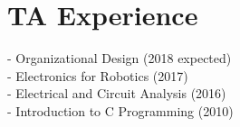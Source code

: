 \documentclass[]{deedy-resume-openfont}
\begin{document}
\begin{minipage}[t]{0.35\textwidth}
\section{TA Experience}
- Organizational Design (2018 expected) \\
- Electronics for Robotics (2017) \\
- Electrical and Circuit Analysis (2016) \\
- Introduction to C Programming (2010) \\
\sectionsep



\iffalse %
\section{Achievements}
- BCIT Graduating Achievement Award for Leadership and Teamwork (2016) \\
- BCIT Award for Distinction (2016) \\
- PepsiCo TPM and Lean Six Sigma (2013) \\
- APEGBC Engineer-in-Training (2012) \\
- French Proficiency - 5wk Immersion (2008)\\
\fi %

%
%

\end{minipage} 
\hfill
\end{document}
